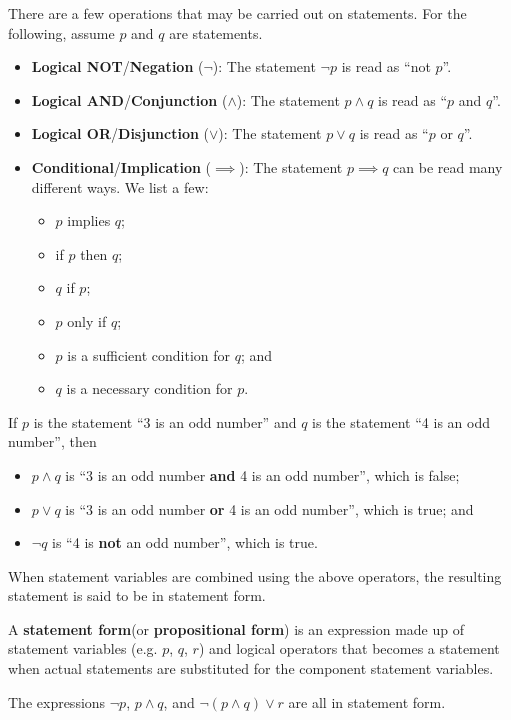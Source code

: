There are a few operations that may be carried out on statements. For the following, assume $p$ and $q$ are statements.
\begin{itemize}
    \item \textbf{Logical NOT}/\textbf{Negation} ($\lnot$): The statement $\lnot p$ is read as ``not $p$''.
    \item \textbf{Logical AND}/\textbf{Conjunction} ($\land$): The statement $p\land q$ is read as ``$p$ and $q$''.
    \item \textbf{Logical OR}/\textbf{Disjunction} ($\lor$): The statement $p\lor q$ is read as ``$p$ or $q$''.
    \item \textbf{Conditional}/\textbf{Implication} ($\implies$): The statement $p \implies q$ can be read many different ways. We list a few:
    \begin{itemize}
        \item $p$ implies $q$;
        \item if $p$ then $q$;
        \item $q$ if $p$;
        \item $p$ only if $q$;
        \item $p$ is a sufficient condition for $q$; and
        \item $q$ is a necessary condition for $p$.
    \end{itemize}
\end{itemize}

\begin{example}
    If $p$ is the statement ``3 is an odd number'' and $q$ is the statement ``4 is an odd number'', then
    \begin{itemize}
        \item $p\land q$ is ``3 is an odd number \textbf{and} 4 is an odd number'', which is false;
        \item $p\lor q$ is ``3 is an odd number \textbf{or} 4 is an odd number'', which is true; and
        \item $\lnot q$ is ``4 is \textbf{not} an odd number'', which is true.
    \end{itemize}
\end{example}

When statement variables are combined using the above operators, the resulting statement is said to be in statement form.
\begin{definition}
    A \textbf{statement form}(or \textbf{propositional form}) is an expression made up of statement variables (e.g. $p$, $q$, $r$) and logical operators that becomes a statement when actual statements are substituted for the component statement variables.
\end{definition}
\begin{example}
    The expressions $\lnot p$, $p \land q$, and $\lnot(p \land q) \lor r$ are all in statement form.
\end{example}

